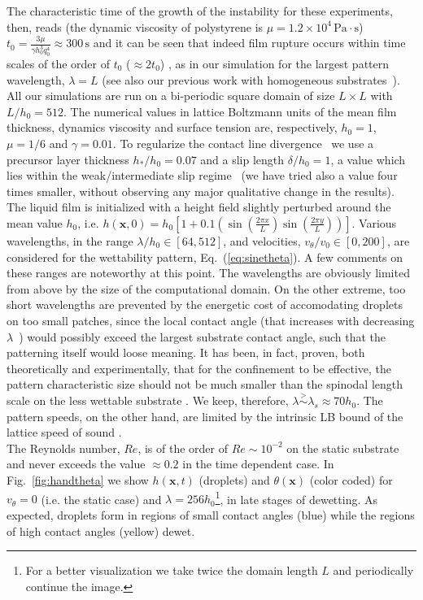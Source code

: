 The characteristic time of the growth of the instability for these experiments, then, reads \cite{PhysRevLett.99.114503} (the dynamic viscosity of polystyrene is 
$\mu = 1.2 \times 10^4 \, \text{Pa} \cdot \text{s}$) $t_0 = \frac{3\mu}{\gamma h_0^3 q_0^4} \approx 300 \, \text{s}$ and it can be seen that indeed film rupture occurs within time 
scales of the order of $t_0$ ($\approx 2 t_0$) \cite{becker2003complex}, as in our 
simulation for the largest pattern wavelength, $\lambda = L$ (see also our previous work
with homogeneous substrates~\cite{PhysRevE.104.034801}).
All our simulations are run on a bi-periodic square domain of size $L \times L$ with 
$L/h_0 = 512 $. The numerical values in lattice Boltzmann units of the 
mean film thickness, dynamics viscosity and surface tension are, respectively, $h_0=1$, $\mu=1/6$
and $\gamma=0.01$.
To regularize the contact line divergence~\cite{huh1971hydrodynamic} we use a precursor layer thickness $h_{\ast}/h_0=0.07$ and a slip length $\delta/h_0 = 1$, 
a value which lies
within the weak/intermediate slip regime~\cite{Peschka9275,fetzer2007quantifying, munch2005lubrication} (we have tried also a value four times smaller, without observing 
any major qualitative change in the results).
The liquid film is initialized with a height field slightly perturbed around the mean value $h_0$, i.e. $h(\mathbf{x},0) = h_0 \left[1 + 0.1 \left(\sin\left(\frac{2\pi x}{L}\right)\sin\left(\frac{2\pi y}{L}\right)\right)\right]$.
Various wavelengths, in the range $\lambda/h_0 \in [64, 512]$, and velocities,
$v_{\theta}/v_0 \in [0, 200]$, are considered for the wettability pattern, Eq.~(\ref{eq:sinetheta}). 
A few comments on these ranges are noteworthy at this point. The wavelengths are obviously limited from above by the size of the computational domain. On the other extreme, too short wavelengths are prevented by
the energetic cost of accomodating droplets on too
small patches, since the local contact angle 
(that increases with decreasing $\lambda$~\cite{SuppMat}) would possibly exceed the largest substrate contact angle, such that the patterning 
itself would loose meaning. 
It has been, in fact, proven, both theoretically and experimentally, that 
for the confinement to be effective, the pattern characteristic size should 
not be much smaller than the spinodal length scale on the less wettable substrate
\cite{KarguptaJCP2002,KarguptaLangmuir2000,Nisato1999,Karim1998}.
We keep, therefore, $\lambda \stackrel{>}{\sim} \lambda_s \approx 70 h_0$.
The pattern speeds, on the other hand, are limited by the intrinsic LB bound of the lattice speed of sound
 \cite{succi}.\\
The Reynolds number, $Re$, is of the order of $Re \sim 10^{-2}$ on the 
static substrate and never exceeds the value $\approx 0.2$ in the time dependent case.
In Fig.~\ref{fig:handtheta} we show $h(\mathbf{x},t)$ (droplets) and $\theta(\mathbf{x})$ (color coded) for $v_{\theta} = 0$ (i.e. the static case) and $\lambda = 256 h_0$\footnote{For a better visualization we take twice the domain length $L$ and periodically continue the image.}, in late stages of dewetting.
As expected, droplets form in regions of small contact angles (blue) while the regions of high contact angles (yellow) dewet.


